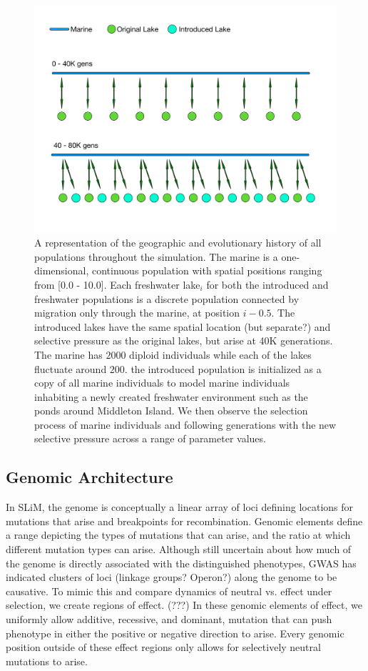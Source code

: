 \documentclass{article}
\begin{document}
\begin{figure}
	\begin{center}
  		\includegraphics[width=0.6\linewidth]{GeographyDiagram}
  		\caption{A representation of the geographic and evolutionary history of all populations throughout the simulation. 
		The marine is a one-dimensional, continuous population with spatial positions ranging from [0.0 - 10.0]. 
		Each freshwater lake$_{i}$ for both the introduced and freshwater populations
		is a discrete population connected by migration only through the marine, at position $i - 0.5$. 
		The introduced lakes have the same spatial location (but separate?) and selective pressure as the original lakes, but arise at 40K generations.
		The marine has $2000$ diploid individuals while each of the lakes fluctuate around $200$. 
		the introduced population is initialized as a copy of all marine individuals to model marine 
		individuals inhabiting a newly created freshwater environment such as the ponds around Middleton Island.
		We then observe the selection process of marine individuals and following generations 
		with the new selective pressure across a range of parameter values. 
		}
  		\label{fig:Geo}
	\end{center}
\end{figure}

\subsection*{Genomic Architecture}

In SLiM, the genome is conceptually a linear array of loci defining locations for 
mutations that arise and breakpoints for recombination. 
Genomic elements define a range depicting the types of mutations that can arise, and the ratio at which different mutation types can arise. 
Although still uncertain about how much of the genome is directly associated with the distinguished phenotypes, 
GWAS has indicated clusters of loci (linkage groups? Operon?) along the genome to be causative. 
To mimic this and compare dynamics of neutral vs. effect under selection, 
we create regions of effect. (???)
In these genomic elements of effect, we uniformly allow additive, recessive, and dominant, mutation that can push phenotype in either the positive or negative direction to arise. 
Every genomic position outside of these effect regions only allows for selectively neutral mutations to arise.
\end{document}

